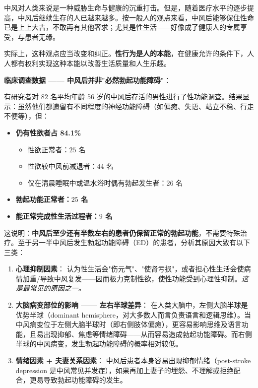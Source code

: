 \documentclass[12pt,a4paper,twoside]{ctexbook}
\begin{document}
\vspace{0.5em}
中风对人类来说是一种威胁生命与健康的沉重打击。但是，随着医疗水平的逐步提高，中风后继续生存的人已越来越多。按一般人的观点来看，中风后能够保住性命已是上上大吉，不敢再有其他奢求；尤其是性生活——好像成了健康人的专属享受，与患者无缘。

实际上，这种观点应当改变和纠正。\textbf{性行为是人的本能}，在健康允许的条件下，人人都有权利实现这种本能以改善生活质量和人生乐趣。

\vspace{0.5em}
\noindent\textbf{临床调查数据 —— 中风后并非"必然勃起功能障碍"}：

有研究者对 $82$ 名平均年龄 56 岁的中风后存活的男性进行了性功能调查。结果显示：虽然他们都遗留有不同程度的神经功能障碍（如偏瘫、失语、站立不稳、行走不便等），但：
\begin{itemize}
	\item \textbf{仍有性欲者占 84.1\%}
	\begin{itemize}
		\item 性欲正常者：$25$ 名
		\item 性欲较中风前减退者：$44$ 名
		\item 仅在清晨睡眠中或温水浴时偶有勃起发生者：$26$ 名
	\end{itemize}
	\item \textbf{勃起功能正常者：$25$ 名}
	\item \textbf{能正常完成性生活过程者：$9$ 名}
\end{itemize}

这说明：\textbf{中风后至少还有半数左右的患者仍保留正常的勃起功能}，不需要特殊治疗。至于另一半中风后发生勃起功能障碍（ED）的患者，分析其原因大致有以下三类：

\begin{enumerate}
	\item \textbf{心理抑制因素}：
	认为性生活会"伤元气"、"使肾亏损"，或者担心性生活会使病情加重/导致中风复发——因而极力克制性欲，使性功能受到心理性抑制。\textit{这是最常见的原因之一。}

	\item \textbf{大脑病变部位的影响 —— 左右半球差异}：
	在人类大脑中，左侧大脑半球是优势半球（dominant hemisphere，对大多数人而言负责语言和逻辑思维）。当中风病变位于左侧大脑半球时（即右侧肢体偏瘫），更容易影响思维及语言功能，且易出现抑郁、焦虑等情绪障碍——从而容易造成勃起功能障碍。而右侧半球的中风病变，发生勃起功能障碍的概率相对较低。

	\item \textbf{情绪因素 + 夫妻关系因素}：
	中风后患者本身容易出现抑郁情绪（post-stroke depression 是中风常见并发症），如果再加上妻子的埋怨、不理解或拒绝配合，更易导致勃起功能障碍的发生。
\end{enumerate}
\end{document}
